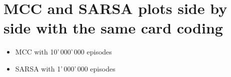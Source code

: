 
\chapter{MCC and SARSA plots side by side with the same card coding} %

\label{MCC and SARSA plots side by side with the same card coding} %

\begin{itemize}
    \item MCC with 10\textit{}'\,000'\,000 episodes
    \item SARSA with 1'\,000'\,000 episodes
\end{itemize}

\vspace{2cm}

